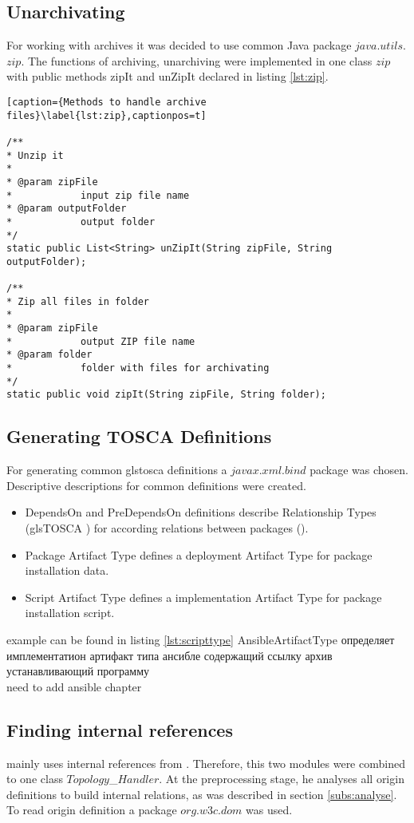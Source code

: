 \subsection*{Unarchivating}
For working with archives it was decided to use common Java package $java$.$utils$.$zip$.
The functions of archiving, unarchiving were implemented in one class $zip$ with public methods zipIt and unZipIt declared in listing \ref{lst:zip}.
\begin{lstlisting}[caption={Methods to handle archive files}\label{lst:zip},captionpos=t] 

/**
* Unzip it
* 
* @param zipFile
*            input zip file name
* @param outputFolder
*            output folder
*/
static public List<String> unZipIt(String zipFile, String outputFolder);

/**
* Zip all files in folder
* 
* @param zipFile
*            output ZIP file name
* @param folder
*            folder with files for archivating
*/
static public void zipIt(String zipFile, String folder);
\end{lstlisting}

\subsection*{Generating TOSCA Definitions}
For generating common gls{tosca} definitions a $javax$.$xml$.$bind$ package was chosen. 
Descriptive descriptions for common definitions were created.
\begin{itemize}
	\item DependsOn and PreDependsOn definitions describe Relationship Types (gls{TOSCA} ) for according relations between packages (). 
	\item Package Artifact Type defines a deployment Artifact Type for package installation data.
	\item Script Artifact Type defines a implementation Artifact Type for package installation script.
\end{itemize}
example can be found in listing \ref{lst:scripttype}
AnsibleArtifactType  определяет имплементатион артифакт типа ансибле содержащий ссылку архив устанавливающий программу 
\\need to add ansible chapter
\fi
\subsection*{Finding internal references}
 mainly uses internal references from .
Therefore, this two modules were combined to one class $Topology$\_$Handler$.	
At the preprocessing stage, he analyses all origin definitions to build internal relations, as was described in section \ref{subs:analyse}.
To read origin definition a package $org$.$w3c$.$dom$ was used.

